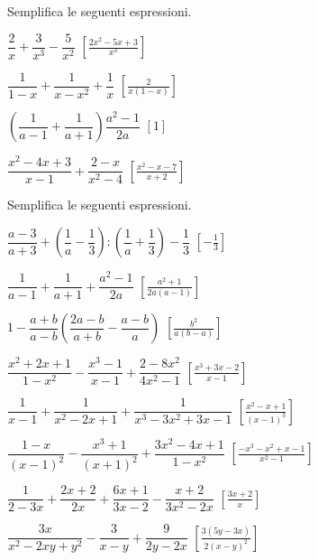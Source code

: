 \begin{esercizio}[\Ast]
\label{ese:19.31}
Semplifica le seguenti espressioni.
\begin{multicols}{2}
\begin{enumeratea}
 \item \(\dfrac{2}{x}+\dfrac{3}{x^{3}}-\dfrac{5}{x^{2}}\)
  \hfill \(\left[\frac{2x^{2}-5x+3}{x^{3}}\right]\)
 \item \(\dfrac{1}{1-x}+\dfrac{1}{x-x^{2}}+\dfrac{1}{x}\)
  \hfill \(\left[\frac{2}{x(1-x)}\right]\)
 \item \(\left(\dfrac{1}{a-1}+\dfrac{1}{a+1}\right)\dfrac{a^{2}-1}{2a}\)
  \hfill \(\left[1\right]\)
 \item \(\dfrac{x^{2}-4x+3}{x-1}+\dfrac{2-x}{x^{2}-4}\)
  \hfill \(\left[\frac{x^{2}-x-7}{x+2}\right]\)
\end{enumeratea}
\end{multicols}
\end{esercizio}

\begin{esercizio}[\Ast]
Semplifica le seguenti espressioni.
\begin{enumeratea}
 \item \(\dfrac{a-3}{a+3}+\left(\dfrac{1}{a}-\dfrac{1}{3}\right):
        \left(\dfrac{1}{a}+\dfrac{1}{3}\right)-\dfrac{1}{3}\)
  \hfill \(\left[-{\frac{1}{3}}\right]\)
 \item \(\dfrac{1}{a-1}+\dfrac{1}{a+1}+\dfrac{a^{2}-1}{2a}\)
  \hfill \(\left[\frac{a^{2}+1}{2a(a-1)}\right]\)
 \item \(1-\dfrac{a+b}{a-b} \left(\dfrac{2a-b}{a+b}-\dfrac{a-b}{a}\right)\)
  \hfill \(\left[\frac{b^{2}}{a(b-a)}\right]\)
 \item \(\dfrac{x^{2}+2x+1}{1-x^{2}}-\dfrac{x^{3}-1}{x-1}+
        \dfrac{2-8x^{2}}{4x^{2}-1}\)
  \hfill \(\left[\frac{x^{3}+3x-2}{x-1}\right]\)
 \item \(\dfrac{1}{x-1}+\dfrac{1}{x^{2}-2x+1}+\dfrac{1}{x^{3}-3x^{2}+3x-1}\)
  \hfill \(\left[\frac{x^{2}-x+1}{(x-1)^{3}}\right]\)
 \item \(\dfrac{1-x}{(x-1)^{2}}-\dfrac{x^{3}+1}{(x+1)^{2}}+
        \dfrac{3x^{2}-4x+1}{1-x^{2}}\)
  \hfill \(\left[\frac{-x^{3}-x^{2}+x-1}{x^{2}-1}\right]\)
 \item \(\dfrac{1}{2-3x}+\dfrac{2x+2}{2x}+\dfrac{6x+1}{3x-2}-
        \dfrac{x+2}{3x^{2}-2x}\)
  \hfill \(\left[\frac{3x+2}{x}\right]\)
 \item \(\dfrac{3x}{x^{2}-2xy+y^{2}}-\dfrac{3}{x-y}+\dfrac{9}{2y-2x}\)
  \hfill \(\left[\frac{3(5y-3x)}{2(x-y)^{2}}\right]\)
\end{enumeratea}
\end{esercizio}

